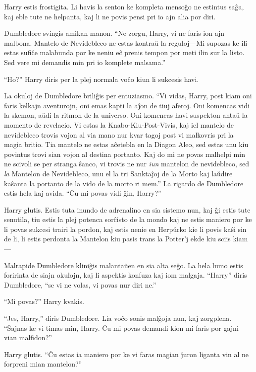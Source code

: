 Harry estis frostigita. Li havis la senton ke kompleta mensoĝo ne
estintus saĝa, kaj eble tute ne helpanta, kaj li ne povis pensi pri io
ajn alia por diri.

Dumbledore svingis amikan manon. ``Ne zorgu, Harry, vi ne faris ion
ajn malbona. Mantelo de Nevidebleco ne estas kontraŭ la reguloj—Mi
supozas ke ili estas sufiĉe malabunda por ke neniu eĉ prenis tempon
por meti ilin sur la listo. Sed vere mi demandis min pri io komplete
malsama.''

``Ho?'' Harry diris per la plej normala voĉo kiun li sukcesis havi.

La okuloj de Dumbledore briliĝis per entuziasmo. ``Vi vidas, Harry,
post kiam oni faris kelkajn aventurojn, oni emas kapti la aĵon de tiuj
aferoj. Oni komencas vidi la skemon, aŭdi la ritmon de la
universo. Oni komencas havi suspekton antaŭ la momento de
revelacio. Vi estas la Knabo-Kiu-Post-Vivis, kaj iel mantelo de
nevidebleco trovis vojon al via mano nur kvar tagoj post vi malkovris
pri la magia britio. Tia mantelo ne estas aĉetebla en la Diagon
Aleo, sed estas unu kiu povintus trovi sian vojon al destina
portanto. Kaj do mi ne povas malhelpi min ne scivoli se per stranga
ŝanco, vi trovis ne nur \emph{iun} mantelon de nevidebleco, sed
\emph{la} Mantelon de Nevidebleco, unu el la tri Sanktaĵoj de la Morto
kaj laŭdire kaŝanta la portanto de la vido de la morto ri mem.'' La
rigardo de Dumbledore estis hela kaj avida. ``Ĉu mi povas vidi ĝin,
Harry?''

Harry glutis. Estis tuta inundo de adrenalino en sia sistemo nun, kaj
ĝi estis tute senutila, tiu estis la plej potenca sorĉisto de la mondo
kaj ne estis maniero por ke li povas sukcesi trairi la pordon, kaj
estis nenie en Herpŭrko kie li povis kaŝi sin de li, li estis perdonta
la Mantelon kiu pasis trans la Potter'j ekde kiu sciis kiam—

Malrapide Dumbledore kliniĝis malantaŭen en sia alta seĝo. La hela
lumo estis foririnta de siajn okulojn, kaj li aspektis konfuza kaj iom
malgaja. ``Harry'' diris Dumbledore, ``se vi ne volas, vi povas nur diri ne.''

``Mi povas?'' Harry kvakis.

``Jes, Harry,'' diris Dumbledore. Lia voĉo sonis malĝoja nun, kaj
zorgplena. ``Ŝajnas ke vi timas min, Harry. Ĉu mi povas demandi kion
mi faris por gajni vian malfidon?''


Harry glutis. ``Ĉu estas ia maniero por ke vi faras magian ĵuron
liganta vin al ne forpreni mian mantelon?''


